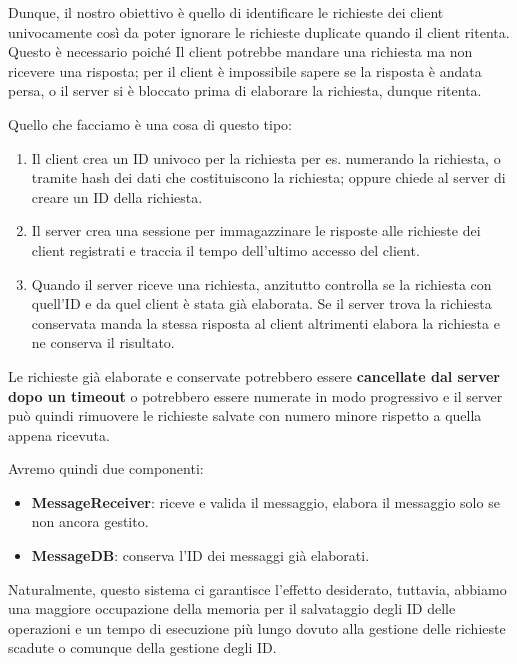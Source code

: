 Dunque, il nostro obiettivo è quello di identificare le richieste dei client univocamente così da poter ignorare le richieste duplicate quando il client ritenta. Questo è necessario poiché Il client potrebbe mandare una richiesta ma non ricevere una risposta; per il client è impossibile sapere se la risposta è andata persa, o il server si è bloccato prima di elaborare la richiesta, dunque ritenta.

Quello che facciamo è una cosa di questo tipo:
\begin{enumerate}
    \item  Il client crea un ID univoco per la richiesta per es. numerando la richiesta, o tramite hash dei dati che costituiscono la richiesta; oppure chiede al server di creare un ID della richiesta.
    \item Il server crea una sessione per immagazzinare le risposte alle richieste dei client registrati e traccia il tempo dell’ultimo accesso del client.
    \item Quando il server riceve una richiesta, anzitutto controlla se la richiesta con quell’ID e da quel client è stata già elaborata. Se il server trova la richiesta conservata manda la stessa risposta al client altrimenti elabora la richiesta e ne conserva il risultato.
\end{enumerate}
Le richieste già elaborate e conservate potrebbero essere
\textbf{cancellate dal server dopo un timeout} o potrebbero essere numerate in modo progressivo e il server può quindi rimuovere le richieste salvate con numero minore rispetto a quella appena ricevuta.

Avremo quindi due componenti:
\begin{itemize}
    \item \textbf{MessageReceiver}: riceve e valida il messaggio, elabora il messaggio solo se non ancora gestito.
    \item \textbf{MessageDB}: conserva l’ID dei messaggi già elaborati.
\end{itemize}
Naturalmente, questo sistema ci garantisce l'effetto desiderato, tuttavia, abbiamo una maggiore occupazione della memoria per il salvataggio degli ID delle operazioni e un tempo di esecuzione più lungo dovuto alla gestione delle richieste scadute o comunque della gestione degli ID. 

